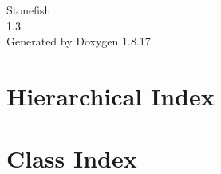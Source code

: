 \let\mypdfximage\pdfximage\def\pdfximage{\immediate\mypdfximage}\documentclass[twoside]{book}
\newcommand{\+}{\discretionary{\mbox{\scriptsize$\hookleftarrow$}}{}{}}
\newcommand{\clearemptydoublepage}{%
  \newpage{\pagestyle{empty}\cleardoublepage}%
}
\begin{document}
\hypersetup{pageanchor=false,
             bookmarksnumbered=true,
             pdfencoding=unicode
            }
\begin{titlepage}
\vspace*{7cm}
\begin{center}%
{\Large Stonefish \\[1ex]\large 1.\+3 }\\
\vspace*{1cm}
{\large Generated by Doxygen 1.8.17}\\
\end{center}
\end{titlepage}
\clearemptydoublepage
{}
\tableofcontents
\clearemptydoublepage
{}
\hypersetup{pageanchor=true}

\chapter{Hierarchical Index}

\chapter{Class Index}

\end{document}

